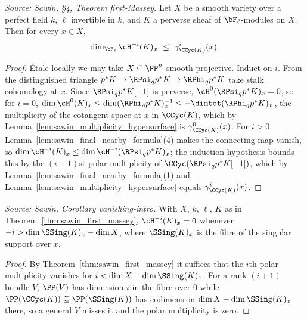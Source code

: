 \begin{theorem}
  \label{thm:sawin_first_massey}
  \textit{Source: Sawin, §4, Theorem first-Massey.}
  Let $X$ be a smooth variety over a perfect field $k$, $\ell$ invertible in $k$,
  and $K$ a perverse sheaf of $\bF_\ell$-modules on $X$.  Then for every $x\in X$,
  \[ \dim_{\bF_\ell}\cH^{-i}(K)_x \ \le\ \gamma^i_{\CCyc(K)}(x). \]
\end{theorem}
\begin{proof}
  Étale-locally we may take $X\subseteq\PP^n$ smooth projective.  Induct on $i$.
  From the distinguished triangle $p^*K\to\RPsi_q p^*K\to\RPhi_q p^*K$ take stalk
  cohomology at $x$.  Since $\RPsi_q p^*K[-1]$ is perverse, $\cH^0(\RPsi_q p^*K)_x=0$,
  so for $i=0$, $\dim\cH^0(K)_x\le\dim(\RPhi_q p^*K)^{-1}_x\le-\dimtot(\RPhi_q
  p^*K)_x$, the multiplicity of the cotangent space at $x$ in $\CCyc(K)$, which by
  Lemma~\ref{lem:sawin_multiplicity_hypersurface} is $\gamma^0_{\CCyc(K)}(x)$.
  For $i>0$, Lemma~\ref{lem:sawin_final_nearby_formula}(4) makes the connecting map
  vanish, so $\dim\cH^{-i}(K)_x\le\dim\cH^{-i}(\RPsi_q p^*K)_x$; the induction
  hypothesis bounds this by the $(i-1)$st polar multiplicity of
  $\CCyc(\RPsi_q p^*K[-1])$, which by
  Lemma~\ref{lem:sawin_final_nearby_formula}(1) and
  Lemma~\ref{lem:sawin_multiplicity_hypersurface} equals $\gamma^i_{\CCyc(K)}(x)$.
\end{proof}

\begin{corollary}
  \label{cor:sawin_vanishing}
  \textit{Source: Sawin, Corollary vanishing-intro.}
  With $X$, $k$, $\ell$, $K$ as in Theorem~\ref{thm:sawin_first_massey},
  $\cH^{-i}(K)_x = 0$ whenever $-i > \dim\SSing(K)_x - \dim X$, where
  $\SSing(K)_x$ is the fibre of the singular support over $x$.
\end{corollary}
\begin{proof}
  By Theorem~\ref{thm:sawin_first_massey} it suffices that the $i$th polar
  multiplicity vanishes for $i<\dim X-\dim\SSing(K)_x$.  For a rank-$(i+1)$ bundle
  $V$, $\PP(V)$ has dimension $i$ in the fibre over $0$ while $\PP(\CCyc(K))
  \subseteq\PP(\SSing(K))$ has codimension $\dim X-\dim\SSing(K)_x$ there, so a
  general $V$ misses it and the polar multiplicity is zero.
\end{proof}
